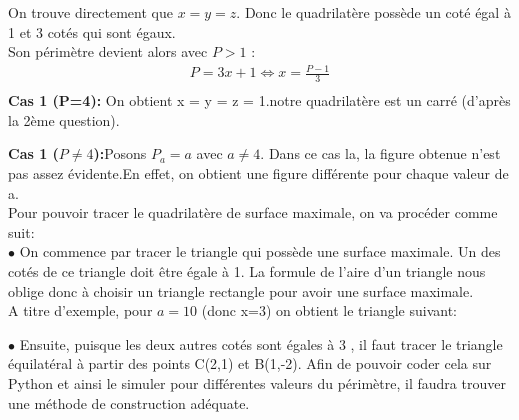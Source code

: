 \documentclass[12pt]{report}
\begin{document}
On trouve directement que $x = y = z$. Donc le quadrilatère possède un coté égal à 1 et 3 cotés qui sont égaux.\\
Son périmètre devient alors avec \textbf{$P>1$} : 
\begin{align*}
     P=3x+1 \Leftrightarrow x = \frac{P-1}{3}\\
\end{align*}
\textbf{Cas 1 (P=4):} On obtient x = y = z = 1.\quad notre quadrilatère est un carré (d'après la 2ème question).\\
\begin{center}
\end{center}
\pagebreak
\textbf{Cas 1 ($P\neq 4$):}Posons $P_{a}=a$ avec $a\neq 4$. Dans ce cas la, la figure obtenue n'est pas assez évidente.\quad En effet, on obtient une figure différente pour chaque valeur de a.\\
Pour pouvoir tracer le quadrilatère de surface maximale, on va procéder comme suit:\\
$\bullet $ On commence par tracer le triangle qui possède une surface maximale. Un des cotés de ce triangle doit être égale à 1. La formule de l'aire d'un triangle nous oblige donc à choisir un triangle rectangle pour avoir une surface maximale.\\A titre d'exemple, pour $a=10$ (donc x=3) on obtient le triangle suivant:
\begin{center}

\end{center}
$\bullet $ Ensuite, puisque les deux autres cotés sont égales à 3 , il faut tracer le triangle équilatéral à partir des points C(2,1) et B(1,-2). Afin de pouvoir coder cela sur Python et ainsi le simuler pour différentes valeurs du périmètre, il faudra trouver une méthode de construction adéquate.\\
\end{document}
